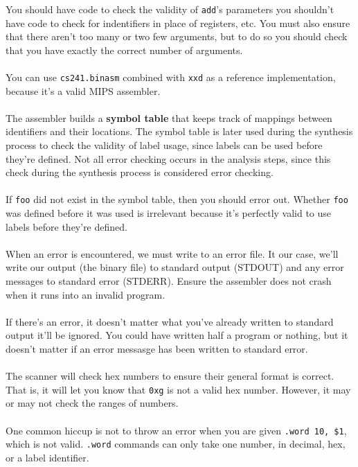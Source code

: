 \documentclass[]{article}
\theoremstyle{definition}
\begin{document}
				You should have code to check the validity of \verb+add+'s parameters \textendash{} you shouldn't have code to check for indentifiers in place of registers, etc. You must also ensure that there aren't too many or two few arguments, but to do so you should check that you have exactly the correct number of arguments.
				\\ \\
				You can use \verb+cs241.binasm+ combined with \verb+xxd+ as a reference implementation, because it's a valid MIPS assembler.
				\\ \\
				The assembler builds a \textbf{symbol table} that keeps track of mappings between identifiers and their locations. The symbol table is later used during the synthesis process to check the validity of label usage, since labels can be used before they're defined. Not all error checking occurs in the analysis steps, since this check during the synthesis process is considered error checking.
				\\ \\
				If \verb+foo+ did not exist in the symbol table, then you should error out. Whether \verb+foo+ was defined before it was used is irrelevant because it's perfectly valid to use labels before they're defined.
				\\ \\
				When an error is encountered, we must write to an error file. It our case, we'll write our output (the binary file) to standard output (STDOUT) and any error messages to standard error (STDERR). Ensure the assembler does not crash when it runs into an invalid program.
				\\ \\
				If there's an error, it doesn't matter what you've already written to standard output \textendash{} it'll be ignored. You could have written half a program or nothing, but it doesn't matter if an error messasge has been written to standard error.
				\\ \\
				The scanner will check hex numbers to ensure their general format is correct. That is, it will let you know that \verb+0xg+ is not a valid hex number. However, it may or may not check the ranges of numbers.
				\\ \\
				One common hiccup is not to throw an error when you are given \verb+.word 10, $1+, which is not valid. \verb+.word+ commands can only take one number, in decimal, hex, or a label identifier.
\end{document}
